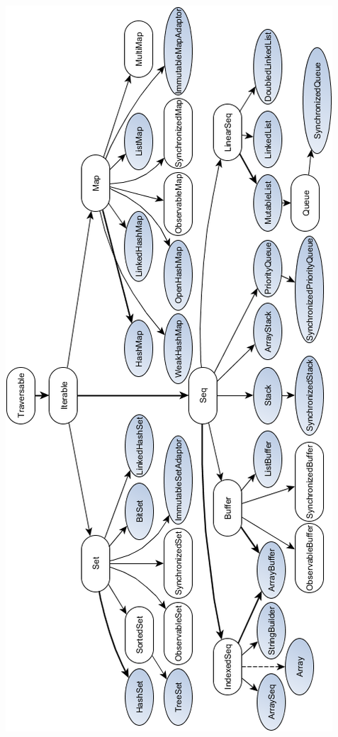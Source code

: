 \documentclass[a4paper,twoside,10pt,landscape]{article}
\begin{document}
\begin{multicols}{3}
\begin{center}
    \includegraphics[scale=.68]{scala-collection-mutable.png}
    \label{fig:scala-collection-mutable}
\end{center}



\end{multicols}
\end{document}
